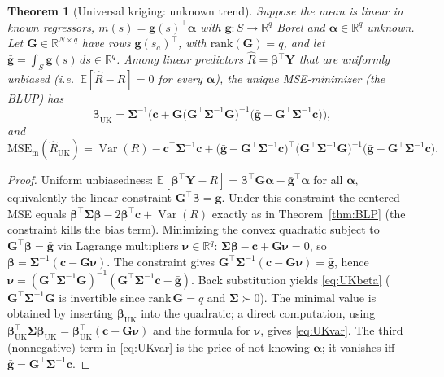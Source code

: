 \documentclass{amsart}
\newtheorem{theorem}{Theorem}
\theoremstyle{definition}
\newcommand{\R}{\mathbb{R}}
\newcommand{\E}{\mathbb{E}}
\newcommand{\Var}{\operatorname{Var}}
\newcommand{\Rhat}{\widehat R}
\begin{document}
\begin{theorem}[Universal kriging: unknown trend]\label{thm:UK}
Suppose the mean is linear in known regressors,
$m(s)=\mathbf g(s)^\top\boldsymbol\alpha$ with $\mathbf g:S\to\R^q$ Borel
and $\boldsymbol\alpha\in\R^q$ unknown. Let $\mathbf G\in\R^{N\times q}$
have rows $\mathbf g(s_a)^\top$, with $\mathrm{rank}(\mathbf G)=q$, and let
$\bar{\mathbf g}=\int_S\mathbf g(s)\,ds\in\R^q$. Among linear predictors
$\Rhat=\boldsymbol\beta^\top\mathbf Y$ that are \emph{uniformly unbiased}
(i.e.\ $\E[\Rhat-R]=0$ for every $\boldsymbol\alpha$), the unique
MSE-minimizer (the BLUP) has
\begin{equation}\label{eq:UKbeta}
\boldsymbol\beta_{\mathrm{UK}}
=\boldsymbol\Sigma^{-1}\Big(\mathbf c
+\mathbf G\big(\mathbf G^\top\boldsymbol\Sigma^{-1}\mathbf G\big)^{-1}
\big(\bar{\mathbf g}-\mathbf G^\top\boldsymbol\Sigma^{-1}\mathbf c\big)\Big),
\end{equation}
and
\begin{equation}\label{eq:UKvar}
\mathrm{MSE}_{\mathrm m}(\Rhat_{\mathrm{UK}})
=\Var(R)-\mathbf c^\top\boldsymbol\Sigma^{-1}\mathbf c
+\big(\bar{\mathbf g}-\mathbf G^\top\boldsymbol\Sigma^{-1}\mathbf c\big)^\top
\big(\mathbf G^\top\boldsymbol\Sigma^{-1}\mathbf G\big)^{-1}
\big(\bar{\mathbf g}-\mathbf G^\top\boldsymbol\Sigma^{-1}\mathbf c\big).
\end{equation}
\end{theorem}
\begin{proof}
Uniform unbiasedness: $\E[\boldsymbol\beta^\top\mathbf Y-R]
=\boldsymbol\beta^\top\mathbf G\boldsymbol\alpha-\bar{\mathbf
g}^\top\boldsymbol\alpha$ for all $\boldsymbol\alpha$, equivalently the
linear constraint $\mathbf G^\top\boldsymbol\beta=\bar{\mathbf g}$. Under
this constraint the centered MSE equals
$\boldsymbol\beta^\top\boldsymbol\Sigma\boldsymbol\beta
-2\boldsymbol\beta^\top\mathbf c+\Var(R)$ exactly as in
Theorem~\ref{thm:BLP} (the constraint kills the bias term). Minimizing the
convex quadratic subject to $\mathbf G^\top\boldsymbol\beta
=\bar{\mathbf g}$ via Lagrange multipliers
$\boldsymbol\nu\in\R^q$:
$\boldsymbol\Sigma\boldsymbol\beta-\mathbf c
+\mathbf G\boldsymbol\nu=0$, so
$\boldsymbol\beta=\boldsymbol\Sigma^{-1}(\mathbf c-\mathbf G\boldsymbol\nu)$.
The constraint gives
$\mathbf G^\top\boldsymbol\Sigma^{-1}(\mathbf c-\mathbf G\boldsymbol\nu)
=\bar{\mathbf g}$, hence
$\boldsymbol\nu=(\mathbf G^\top\boldsymbol\Sigma^{-1}\mathbf G)^{-1}
(\mathbf G^\top\boldsymbol\Sigma^{-1}\mathbf c-\bar{\mathbf g})$. Back
substitution yields \eqref{eq:UKbeta} ($\mathbf
G^\top\boldsymbol\Sigma^{-1}\mathbf G$ is invertible since
$\mathrm{rank}\,\mathbf G=q$ and $\boldsymbol\Sigma\succ0$). The minimal
value is obtained by inserting $\boldsymbol\beta_{\mathrm{UK}}$ into the
quadratic; a direct computation, using
$\boldsymbol\beta_{\mathrm{UK}}^\top\boldsymbol\Sigma
\boldsymbol\beta_{\mathrm{UK}}
=\boldsymbol\beta_{\mathrm{UK}}^\top(\mathbf c-\mathbf G\boldsymbol\nu)$
and the formula for $\boldsymbol\nu$, gives \eqref{eq:UKvar}. The third
(nonnegative) term in \eqref{eq:UKvar} is the price of not knowing
$\boldsymbol\alpha$; it vanishes iff
$\bar{\mathbf g}=\mathbf G^\top\boldsymbol\Sigma^{-1}\mathbf c$.
\end{proof}
\end{document}
